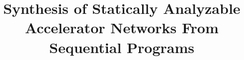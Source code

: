 \documentclass{sig-alternate}
\begin{document}
%

\title{Synthesis of Statically Analyzable Accelerator Networks From Sequential Programs}
%
%
%
%
%

%
\end{document}
